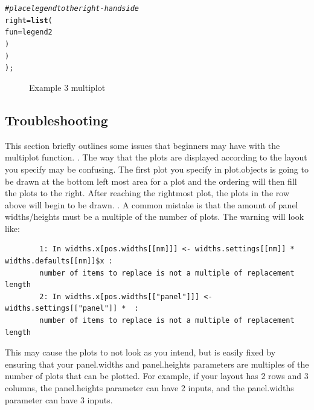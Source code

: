 \documentclass[letterpaper]{article}\usepackage[]{graphicx}\usepackage[]{color}
\makeatletter
\newcommand{\hlcom}[1]{\textcolor[rgb]{0.678,0.584,0.686}{\textit{#1}}}%
\newcommand{\hlstd}[1]{\textcolor[rgb]{0.345,0.345,0.345}{#1}}%
\newcommand{\hlkwc}[1]{\textcolor[rgb]{0.333,0.667,0.333}{#1}}%
\newcommand{\hlkwd}[1]{\textcolor[rgb]{0.737,0.353,0.396}{\textbf{#1}}}%
\newenvironment{kframe}{%
 \def\at@end@of@kframe{}%
 \ifinner\ifhmode%
  \def\at@end@of@kframe{\end{minipage}}%
  \begin{minipage}{\columnwidth}%
 \fi\fi%
 \def\FrameCommand##1{\hskip\@totalleftmargin \hskip-\fboxsep
 \colorbox{shadecolor}{##1}\hskip-\fboxsep
     \hskip-\linewidth \hskip-\@totalleftmargin \hskip\columnwidth}%
 \MakeFramed {\advance\hsize-\width
   \@totalleftmargin\z@ \linewidth\hsize
   \@setminipage}}%
 {\par\unskip\endMakeFramed%
 \at@end@of@kframe}
\newenvironment{knitrout}{}{} %
\makeatother
\begin{document}
\begin{knitrout}
\begin{kframe}
\begin{alltt}
        \hlcom{# place legend to the right-hand side}
        \hlkwc{right} \hlstd{=} \hlkwd{list}\hlstd{(}
                \hlkwc{fun} \hlstd{= legend2}
                \hlstd{)}
        \hlstd{)}
    \hlstd{);}
\end{alltt}
\end{kframe}\begin{figure}

{\centering {} 

}

\caption[Example 3 multiplot]{Example 3 multiplot\label{fig:multiplotex3_final}}
\end{figure}


\end{knitrout}

\subsection{Troubleshooting}
This section briefly outlines some issues that beginners may have with the multiplot function. 
\newline
{}. The way that the plots are displayed according to the layout you specify may be confusing. The first plot you specify in plot.objects is going to be drawn at the bottom left most area for a plot and the ordering will then fill the plots to the right. After reaching the rightmost plot, the plots in the row above will begin to be drawn. 
\newline
{}. A common mistake is that the amount of panel widths/heights must be a multiple of the number of plots. The warning will look like:

\begin{verbatim}
        1: In widths.x[pos.widths[[nm]]] <- widths.settings[[nm]] * widths.defaults[[nm]]$x : 
        number of items to replace is not a multiple of replacement length
        2: In widths.x[pos.widths[["panel"]]] <- widths.settings[["panel"]] *  :
        number of items to replace is not a multiple of replacement length
\end{verbatim}

This may cause the plots to not look as you intend, but is easily fixed by ensuring that your panel.widths and panel.heights parameters are multiples of the number of plots that can be plotted. For example, if your layout has 2 rows and 3 columns, the panel.heights parameter can have 2 inputs, and the panel.widths parameter can have 3 inputs.
\end{document}
